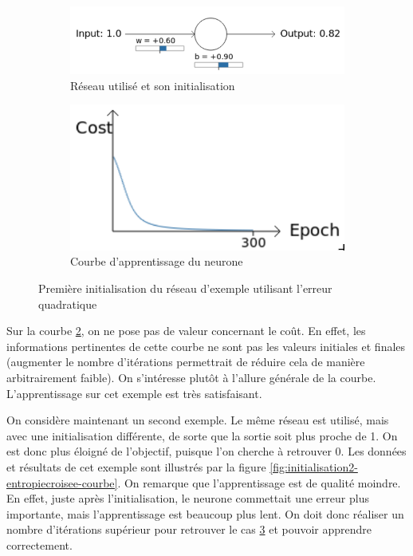 \begin{figure}[h]
\centering
\begin{subfigure}{.5\textwidth}
  \centering
  \includegraphics[width=.6\linewidth]{img/entropiecroisee_reseau_utilise.png}
  \caption{Réseau utilisé et son initialisation}
  \label{fig:initialisation1-entropiecroisee-schema}
\end{subfigure}%
\begin{subfigure}{.4\textwidth}
  \centering
  \includegraphics[width=.4\linewidth]{img/entropiecroisee_apprentissage1.png}
  \caption{Courbe d'apprentissage du neurone}
  \label{fig:initialisation1-entropiecroisee-courbe}
\end{subfigure}
\caption{Première initialisation du réseau d'exemple utilisant l'erreur quadratique}
\label{fig:initialisation1-entropiecroisee}
\end{figure}


Sur la courbe \ref{fig:initialisation1-entropiecroisee-courbe}, 
on ne pose pas de valeur concernant le coût. En effet, les informations pertinentes de cette courbe ne sont pas les valeurs initiales 
et finales (augmenter le nombre d'itérations permettrait de réduire cela de manière arbitrairement faible). On s'intéresse plutôt à l'allure générale de 
la courbe. L'apprentissage sur cet exemple est très satisfaisant. 

On considère maintenant un second exemple. Le même réseau est utilisé, mais avec 
une initialisation différente, de sorte que la sortie soit plus proche de 1. On est donc plus éloigné de l'objectif, puisque l'on cherche à retrouver 0.
Les données et résultats de cet exemple sont illustrés par la figure \ref{fig:initialisation2-entropiecroisee-courbe}.
On remarque que l'apprentissage est de qualité moindre. En effet, juste après l'initialisation, le neurone commettait une erreur plus importante,
mais l'apprentissage est beaucoup plus lent. On doit donc réaliser un nombre d'itérations supérieur pour retrouver le cas
\ref{fig:initialisation1-entropiecroisee} et pouvoir apprendre correctement.

